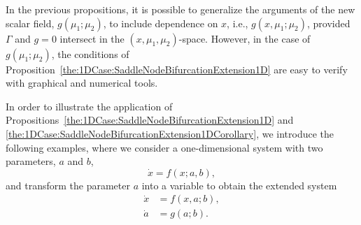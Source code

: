 \documentclass[12pt]{article}
\begin{document}
In the previous propositions, it is possible to generalize the arguments of the new scalar field, $g(\mu_{1};\mu_{2})$, to include dependence on $x$, i.e., $g(x,\mu_{1};\mu_{2})$, provided $\Gamma$ and $g=0$ intersect in the $(x,\mu_{1},\mu_{2})$-space. However, in the case of $g(\mu_{1};\mu_{2})$, the conditions of Proposition~\ref{the:1DCase:SaddleNodeBifurcationExtension1D} are easy to verify with graphical and numerical tools.

In order to illustrate the application of Propositions~\ref{the:1DCase:SaddleNodeBifurcationExtension1D} and \ref{the:1DCase:SaddleNodeBifurcationExtension1DCorollary}, we introduce the following examples, where we consider a one-dimensional system with two parameters, $a$ and $b$,
\[\dot x = f(x;a,b),\]
and transform the parameter $a$ into a variable to obtain the extended system
\[\left.\begin{aligned}
        \dot x &= f(x,a;b), \\
        \dot a &= g(a;b).
    \end{aligned}\right.\]
\end{document}
